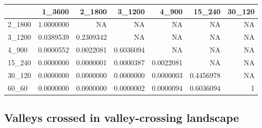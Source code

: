 \documentclass[
]{book}
\begin{document}
\begin{table}
\centering
\begin{tabular}[t]{l|r|r|r|r|r|r}
\hline
  & 1\_3600 & 2\_1800 & 3\_1200 & 4\_900 & 15\_240 & 30\_120\\
\hline
2\_1800 & 1.0000000 & NA & NA & NA & NA & NA\\
\hline
3\_1200 & 0.0389539 & 0.2309342 & NA & NA & NA & NA\\
\hline
4\_900 & 0.0000552 & 0.0022081 & 0.6036094 & NA & NA & NA\\
\hline
15\_240 & 0.0000000 & 0.0000001 & 0.0000387 & 0.0022081 & NA & NA\\
\hline
30\_120 & 0.0000000 & 0.0000000 & 0.0000000 & 0.0000003 & 0.4456978 & NA\\
\hline
60\_60 & 0.0000000 & 0.0000000 & 0.0000002 & 0.0000094 & 0.6036094 & 1\\
\hline
\end{tabular}
\end{table}

\hypertarget{valleys-crossed-in-valley-crossing-landscape-1}{%
\subsection{Valleys crossed in valley-crossing landscape}\label{valleys-crossed-in-valley-crossing-landscape-1}}
\end{document}
